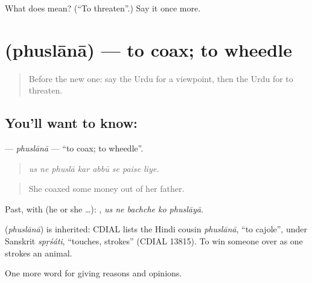 \begin{tcolorbox}[breakable,colback=teal!4,colframe=teal!35!black,title={Before you move on}]
What does  mean? (\textquotedblleft{}To threaten\textquotedblright{}.) Say it once more.
\end{tcolorbox}
\section[\texorpdfstring{\ur{پھسلانا} (phuslānā)}{پھسلانا (phuslānā)}]{ (phuslānā) — to coax; to wheedle}

\label{lesson:UR-C348-phuslana}



\begin{quote}
Before the new one: say the Urdu for a viewpoint, then the Urdu for to threaten.
\end{quote}

\subsection*{You'll want to know: }
\textbf{} — \emph{phuslānā} — \textquotedblleft{}to coax; to wheedle\textquotedblright{}.

\begin{quote}
       
\end{quote}

\begin{quote}
\emph{us ne phuslā kar abbū se paise liye.}
\end{quote}

\begin{quote}
She coaxed some money out of her father.
\end{quote}

Past, with  (he or she …):     , \emph{us ne bachche ko phuslāyā}.

\begin{cousinweb}
\textbf{} (\emph{phuslānā}) is inherited: CDIAL lists the Hindi cousin \emph{phuslānā}, \textquotedblleft{}to cajole\textquotedblright{}, under Sanskrit \emph{spṛśáti}, \textquotedblleft{}touches, strokes\textquotedblright{} (CDIAL 13815). To win someone over as one strokes an animal.
\end{cousinweb}

\begin{grammarlens}[title={What you've built}]
One more word for giving reasons and opinions.
\end{grammarlens}

